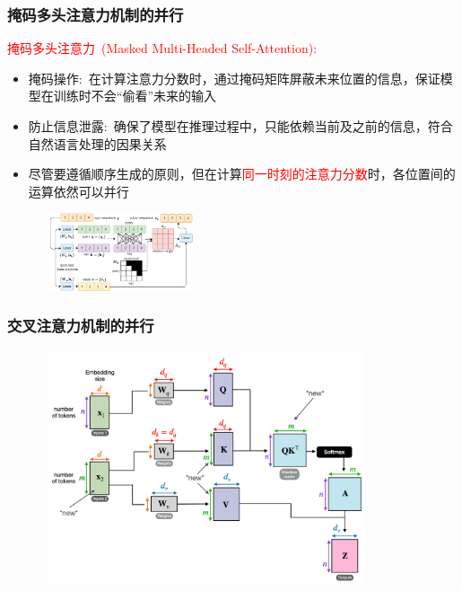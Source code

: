 \begin{frame}
    \frametitle{掩码多头注意力机制的并行}
\textcolor{red}{掩码多头注意力~\textrm{(Masked Multi-Headed Self-Attention):}}
    \begin{itemize}
		\setlength{\itemsep}{10pt}
        \item 掩码操作:~在计算注意力分数时，通过掩码矩阵屏蔽未来位置的信息，保证模型在训练时不会“偷看”未来的输入
		\vskip 1pt
		{\fontsize{7.2pt}{6.2pt}}
        \item 防止信息泄露:~确保了模型在推理过程中，只能依赖当前及之前的信息，符合自然语言处理的因果关系
	\item 尽管要遵循顺序生成的原则，但在计算\textcolor{red}{同一时刻的注意力分数}时，各位置间的运算依然可以并行
    \end{itemize}
\begin{figure}[h!]
\vspace*{-0.05in}
\centering
\includegraphics[height=0.9in, width=1.8in, viewport=0 0 546 292, clip]{Figures/Masked_multi-head_self-attention-for-a-target_sequence-y.png}
\label{Masked_multi-head_self-attention-for-a-target_sequence-y}
\end{figure}
\end{frame}

\begin{frame}
    \frametitle{交叉注意力机制的并行}
\begin{figure}[h!]
\vspace*{-0.15in}
\centering
\includegraphics[height=2.7in, width=3.8in, viewport=0 0 1456 1061, clip]{Figures/Transformer_The_concept_of_cross-attention.png}
\label{Transformer_The_concept_of_cross-attention}
\end{figure}
\end{frame}

